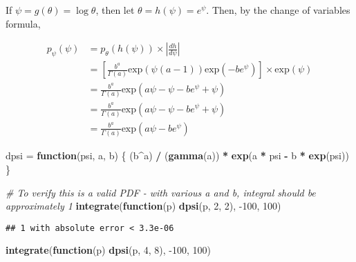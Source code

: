 \documentclass[]{article}
\newenvironment{Shaded}{\begin{snugshade}}{\end{snugshade}}
\newcommand{\CommentTok}[1]{\textcolor[rgb]{0.56,0.35,0.01}{\textit{#1}}}
\newcommand{\ControlFlowTok}[1]{\textcolor[rgb]{0.13,0.29,0.53}{\textbf{#1}}}
\newcommand{\DecValTok}[1]{\textcolor[rgb]{0.00,0.00,0.81}{#1}}
\newcommand{\KeywordTok}[1]{\textcolor[rgb]{0.13,0.29,0.53}{\textbf{#1}}}
\newcommand{\NormalTok}[1]{#1}
\newcommand{\OperatorTok}[1]{\textcolor[rgb]{0.81,0.36,0.00}{\textbf{#1}}}
\newcommand{\StringTok}[1]{\textcolor[rgb]{0.31,0.60,0.02}{#1}}
\begin{document}
If \(\psi = g(\theta) = \log \theta\), then let
\(\theta = h(\psi) = e^\psi\). Then, by the change of variables formula,

\begin{align}
p_{\psi}(\psi) &= p_{\theta}(h(\psi)) \times \left| \frac{dh}{d\psi} \right| \\
&= \left[ \frac{b^a}{\Gamma(a)} \text{exp}\left(\psi (a - 1)\right) \text{exp}\left( -b e^\psi \right)  \right] \times \text{exp}\left( \psi \right) \\
&= \frac{b^a}{\Gamma(a)} \text{exp}\left(a\psi - \psi - b e^\psi + \psi \right) \\
&= \frac{b^a}{\Gamma(a)} \text{exp}\left(a\psi - \psi - b e^\psi + \psi \right) \\
&= \frac{b^a}{\Gamma(a)} \text{exp}\left(a\psi - b e^\psi \right)
\end{align}

\begin{Shaded}
\begin{Highlighting}[]
\NormalTok{dpsi =}\StringTok{ }\ControlFlowTok{function}\NormalTok{(psi, a, b) \{}
\NormalTok{  (b}\OperatorTok{^}\NormalTok{a) }\OperatorTok{/}\StringTok{ }\NormalTok{(}\KeywordTok{gamma}\NormalTok{(a)) }\OperatorTok{*}\StringTok{ }\KeywordTok{exp}\NormalTok{(a }\OperatorTok{*}\StringTok{ }\NormalTok{psi }\OperatorTok{-}\StringTok{ }\NormalTok{b }\OperatorTok{*}\StringTok{ }\KeywordTok{exp}\NormalTok{(psi))}
\NormalTok{\}}

\CommentTok{# To verify this is a valid PDF - with various a and b, integral should be approximately 1}
\KeywordTok{integrate}\NormalTok{(}\ControlFlowTok{function}\NormalTok{(p) }\KeywordTok{dpsi}\NormalTok{(p, }\DecValTok{2}\NormalTok{, }\DecValTok{2}\NormalTok{), }\DecValTok{-100}\NormalTok{, }\DecValTok{100}\NormalTok{)}
\end{Highlighting}
\end{Shaded}

\begin{verbatim}
## 1 with absolute error < 3.3e-06
\end{verbatim}

\begin{Shaded}
\begin{Highlighting}[]
\KeywordTok{integrate}\NormalTok{(}\ControlFlowTok{function}\NormalTok{(p) }\KeywordTok{dpsi}\NormalTok{(p, }\DecValTok{4}\NormalTok{, }\DecValTok{8}\NormalTok{), }\DecValTok{-100}\NormalTok{, }\DecValTok{100}\NormalTok{)}
\end{Highlighting}
\end{Shaded}
\end{document}
